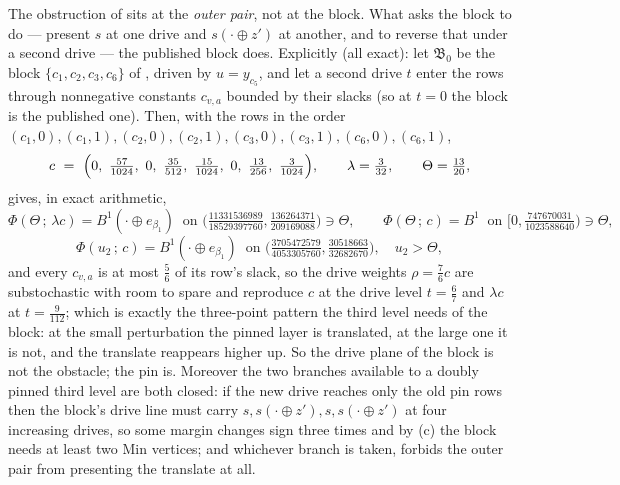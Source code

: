 \begin{remark}\label{rs:localised}
The obstruction of  sits at the \emph{outer pair},
not at the block. What  asks the block to do --- present
$s$ at one drive and $s(\cdot\oplus z')$ at another, and to reverse that under a
second drive --- the published block does. Explicitly (all exact): let
$\mathfrak B_0$ be the block $\{c_1,c_2,c_3,c_6\}$ of
, driven by $u=y_{c_5}$, and let a second drive $t$
enter the rows through nonnegative constants $c_{v,a}$ bounded by their slacks
(so at $t=0$ the block is the published one). Then, with the rows in the order
$(c_1,0),(c_1,1),(c_2,0),(c_2,1),(c_3,0),(c_3,1),(c_6,0),(c_6,1)$,
\[
  c\ =\ \Bigl(0,\ \tfrac{57}{1024},\ 0,\ \tfrac{35}{512},\ \tfrac{15}{1024},\ 0,\
        \tfrac{13}{256},\ \tfrac3{1024}\Bigr),\qquad \lambda=\tfrac3{32},\qquad
  \Theta=\tfrac{13}{20},
\]
gives, in exact arithmetic,
\[
 \Phi(\Theta\,;\,\lambda c)=B^{1}(\cdot\oplus e_{\beta_1})\ \text{ on }
   \bigl(\tfrac{11331536989}{18529397760},\tfrac{136264371}{209169088}\bigr)\ni\Theta,
 \qquad
 \Phi(\Theta\,;\,c)=B^{1}\ \text{ on }\bigl[0,\tfrac{747670031}{1023588640}\bigr)\ni\Theta,
\]
\[
 \Phi(u_2\,;\,c)=B^{1}(\cdot\oplus e_{\beta_1})\ \text{ on }
  \bigl(\tfrac{3705472579}{4053305760},\tfrac{30518663}{32682670}\bigr),\quad u_2>\Theta ,
\]
and every $c_{v,a}$ is at most $\tfrac56$ of its row's slack, so the drive
weights $\rho=\tfrac76c$ are substochastic with room to spare and reproduce $c$
at the drive level $t=\tfrac67$ and $\lambda c$ at $t=\tfrac9{112}$;
which is exactly the three-point pattern the third level needs of the block: at
the small perturbation the pinned layer is translated, at the large one it is
not, and the translate reappears higher up. So the drive plane of the block is
not the obstacle; the pin is. Moreover the two branches available to a doubly
pinned third level are both closed: if the new drive reaches only the old pin
rows then the block's drive line must carry $s,s(\cdot\oplus z'),s,
s(\cdot\oplus z')$ at four increasing drives, so some margin changes sign three
times and by \Cref{rs:drive}(c) the block needs at least two Min vertices; and
whichever branch is taken, \Cref{rs:no-outer-translate} forbids the outer pair
from presenting the translate at all.
\end{remark}

